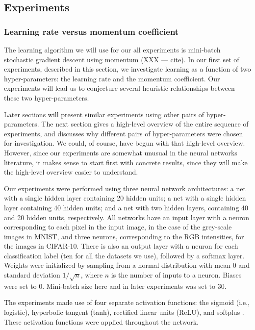 \documentclass[10pt]{article}
\begin{document}
\subsection*{Experiments}

\subsubsection*{Learning rate versus momentum coefficient}

The learning algorithm we will use for our all experiments is
mini-batch stochastic gradient descent using momentum (XXX --- cite).
In our first set of experiments, described in this section, we
investigate learning as a function of two hyper-parameters: the
learning rate and the momentum coefficient.  Our experiments will lead
us to conjecture several heuristic relationships between these two
hyper-parameters.

Later sections will present similar experiments using other pairs of
hyper-parameters.  The next section gives a high-level overview of the
entire sequence of experiments, and discusses why different pairs of
hyper-parameters were chosen for investigation.  We could, of course,
have begun with that high-level overview.  However, since our
experiments are somewhat unusual in the neural networks literature, it
makes sense to start first with concrete results, since they will make
the high-level overview easier to understand.

Our experiments were performed using three neural network
architectures: a net with a single hidden layer containing 20 hidden
units; a net with a single hidden layer containing 40 hidden units;
and a net with two hidden layers, containing 40 and 20 hidden units,
respectively. All networks have an input layer with a neuron
corresponding to each pixel in the input image, in the case of the
grey-scale images in MNIST, and three neurons, corresponding to the
RGB intensities, for the images in CIFAR-10.  There is also an output
layer with a neuron for each classification label (ten for all the
datasets we use), followed by a softmax layer.  Weights were
initialized by sampling from a normal distribution with mean $0$ and
standard deviation $1/\sqrt{n}$, where $n$ is the number of inputs to
a neuron.  Biases were set to $0$.  Mini-batch size here and in later
experiments was set to $30$.

The experiments made use of four separate activation functions: the
sigmoid (i.e., logistic), hyperbolic tangent (tanh), rectified linear
units (ReLU), and softplus \cite{Glorot2010a,Dugas2001a}.  These
activation functions were applied throughout the network.
\end{document}
